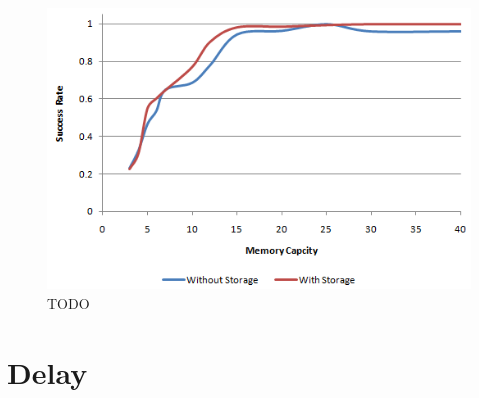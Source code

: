 \begin{figure}[h!]
    \centering
    \includegraphics[width=.9\textwidth]{images/result_sccess_sim2byss_128}
    \caption{TODO}
\end{figure}

\section{Delay}